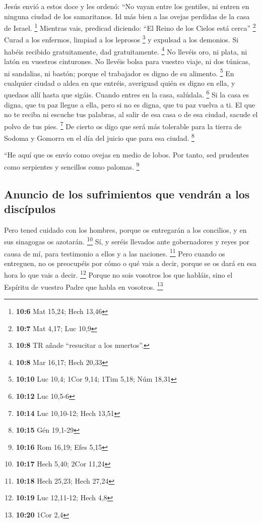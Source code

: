  Jesús envió a estos doce y les ordenó: ``No vayan entre
los gentiles, ni entren en ninguna ciudad de los samaritanos.
 Id más bien a las ovejas perdidas de la casa de Israel.
\footnote{\textbf{10:6} Mat 15,24; Hech 13,46}  Mientras
vais, predicad diciendo: ``El Reino de los Cielos está cerca''
\footnote{\textbf{10:7} Mat 4,17; Luc 10,9}  Curad a los
enfermos, limpiad a los leprosos \footnote{\textbf{10:8} TR añade
  ``resucitar a los muertos''.} y expulsad a los demonios. Si habéis
recibido gratuitamente, dad gratuitamente. \footnote{\textbf{10:8} Mar
  16,17; Hech 20,33}  No llevéis oro, ni plata, ni latón
en vuestros cinturones.  No llevéis bolsa para vuestro
viaje, ni dos túnicas, ni sandalias, ni bastón; porque el trabajador es
digno de su alimento. \footnote{\textbf{10:10} Luc 10,4; 1Cor 9,14; 1Tim
  5,18; Núm 18,31}  En cualquier ciudad o aldea en que
entréis, averiguad quién es digno en ella, y quedaos allí hasta que
sigáis.  Cuando entres en la casa, salúdala. \footnote{\textbf{10:12}
  Luc 10,5-6}  Si la casa es digna, que tu paz llegue a
ella, pero si no es digna, que tu paz vuelva a ti.  El
que no te reciba ni escuche tus palabras, al salir de esa casa o de esa
ciudad, sacude el polvo de tus pies. \footnote{\textbf{10:14} Luc
  10,10-12; Hech 13,51}  De cierto os digo que será más
tolerable para la tierra de Sodoma y Gomorra en el día del juicio que
para esa ciudad. \footnote{\textbf{10:15} Gén 19,1-29}

 ``He aquí que os envío como ovejas en medio de lobos.
Por tanto, sed prudentes como serpientes y sencillos como palomas.
\footnote{\textbf{10:16} Rom 16,19; Efes 5,15}

\hypertarget{anuncio-de-los-sufrimientos-que-vendruxe1n-a-los-discuxedpulos}{%
\subsection{Anuncio de los sufrimientos que vendrán a los
discípulos}\label{anuncio-de-los-sufrimientos-que-vendruxe1n-a-los-discuxedpulos}}

 Pero tened cuidado con los hombres, porque os entregarán
a los concilios, y en sus sinagogas os azotarán. \footnote{\textbf{10:17}
  Hech 5,40; 2Cor 11,24}  Sí, y seréis llevados ante
gobernadores y reyes por causa de mí, para testimonio a ellos y a las
naciones. \footnote{\textbf{10:18} Hech 25,23; Hech 27,24}
 Pero cuando os entreguen, no os preocupéis por cómo o
qué vais a decir, porque se os dará en esa hora lo que vais a decir.
\footnote{\textbf{10:19} Luc 12,11-12; Hech 4,8}  Porque
no sois vosotros los que habláis, sino el Espíritu de vuestro Padre que
habla en vosotros. \footnote{\textbf{10:20} 1Cor 2,4}

